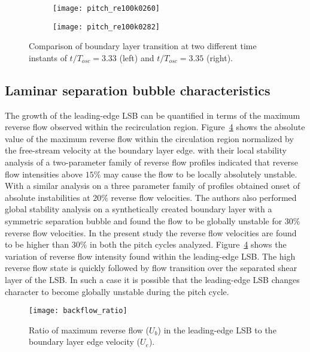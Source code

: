 \begin{figure}
	\centering
	\begin{subfigure}[t]{0.48\textwidth}
		\centering
		\texttt{[image: pitch\_re100k0260]}
		\label{fig:upstream_1}
	\end{subfigure}
	\begin{subfigure}[t]{0.48\textwidth}
		\centering
		\texttt{[image: pitch\_re100k0282]}
		\label{fig:upstream_2}
	\end{subfigure}
	\caption{Comparison of boundary layer transition at two different time instants of $t/T_{osc}=3.33$ (left) and $t/T_{osc}=3.35$ (right).}
	\label{fig:transition_complex}
\end{figure}

\subsection{Laminar separation bubble characteristics}

The growth of the leading-edge LSB can be quantified in terms of the maximum reverse flow observed within the recirculation region. Figure~\ref{fig:backflow_ratio} shows the absolute value of the maximum reverse flow within the circulation region normalized by the free-stream velocity at the boundary layer edge. \cite{alam00} with their local stability analysis of a two-parameter family of reverse flow profiles indicated that reverse flow intensities above $15\%$ may cause the flow to be locally absolutely unstable. With a similar analysis on a three parameter family of profiles \cite{hammond98} obtained onset of absolute instabilities at $20\%$ reverse flow velocities. The authors also performed global stability analysis on a synthetically created boundary layer with a symmetric separation bubble \citep{hammond98} and found the flow to be globally unstable for $30\%$ reverse flow velocities. In the present study the reverse flow velocities are found to be higher than $30\%$ in both the pitch cycles analyzed. Figure~\ref{fig:backflow_ratio} shows the variation of reverse flow intensity found within the leading-edge LSB. The high reverse flow state is quickly followed by flow transition over the separated shear layer of the LSB. In such a case it is possible that the leading-edge LSB changes character to become globally unstable during the pitch cycle. 
\begin{figure}
	\centering
	\texttt{[image: backflow\_ratio]}
	\caption{Ratio of maximum reverse flow ($U_{b}$) in the leading-edge LSB to the boundary layer edge velocity ($U_{e}$).} 
	\label{fig:backflow_ratio}
\end{figure}


